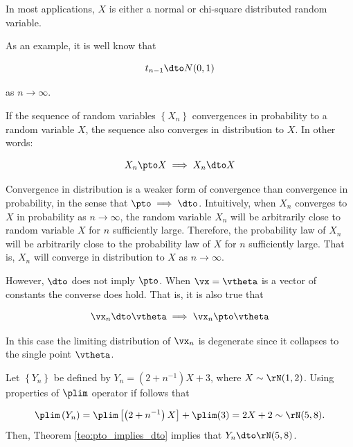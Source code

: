 \documentclass[english,12pt]{book}\usepackage[]{graphicx}\usepackage[]{xcolor}
\begin{document}
\begin{remark}
In most applications, $X$ is either a normal or chi-square distributed random variable. 
\end{remark}


As an example, it is well know that 

\begin{equation*}
t_{n-1}\dto N(0, 1)
\end{equation*}

as $n\to \infty$.

\begin{theorem}\label{teo:pto_implies_dto}
  If the sequence of random variables $\left\lbrace X_n \right\rbrace$ convergences in probability to a random variable $X$, the sequence also converges in distribution to $X$. In other words:
  
  \begin{equation*}
    X_n\pto X\implies X_n\dto X
  \end{equation*}
\end{theorem}

Convergence in distribution is a weaker form of convergence than convergence in probability, in the sense that $\pto \implies \dto$. Intuitively, when $X_n$ converges to $X$ in probability as $n\to \infty$, the random variable $X_n$ will be arbitrarily close to random variable $X$ for $n$ sufficiently large. Therefore, the probability law of $X_n$ will be arbitrarily close to the probability law of $X$ for $n$ sufficiently large. That is, $X_n$ will converge in distribution to $X$ as $n\to \infty$.

However, $\dto$ does not imply $\pto$. When $\vx = \vtheta$ is a vector of constants the converse does hold. That is, it is also true that

\begin{equation*}
  \vx_n\dto \vtheta \implies \vx_n\pto \vtheta
\end{equation*}

In this case the limiting distribution of $\vx_n$ is degenerate since it collapses to the single point $\vtheta$.

\begin{example}
Let $\left\lbrace Y_n\right\rbrace$ be defined by $Y_n = \left(2 + n^{-1}\right)X + 3$, where $X\sim \rN(1, 2)$. Using properties of $\plim$ operator if follows that

\begin{equation*}
  \plim \left(Y_n\right) = \plim \left[\left(2 + n^{-1}\right)X\right] + \plim(3) = 2X + 2 \sim \rN(5, 8). 
\end{equation*}
Then, Theorem \ref{teo:pto_implies_dto} implies that $Y_n\dto \rN(5, 8)$.
\end{example}
\end{document}

